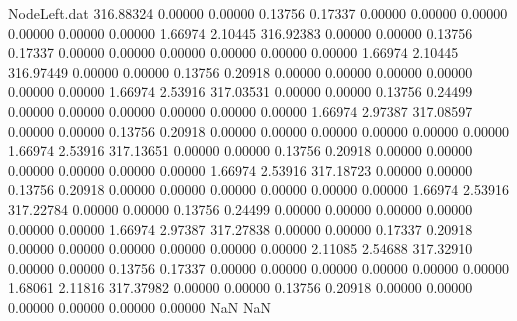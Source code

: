 \begin{filecontents}{NodeLeft.dat}
 316.88324    0.00000    0.00000     0.13756    0.17337    0.00000    0.00000    0.00000    0.00000    0.00000    0.00000    1.66974    2.10445
 316.92383    0.00000    0.00000     0.13756    0.17337    0.00000    0.00000    0.00000    0.00000    0.00000    0.00000    1.66974    2.10445
 316.97449    0.00000    0.00000     0.13756    0.20918    0.00000    0.00000    0.00000    0.00000    0.00000    0.00000    1.66974    2.53916
 317.03531    0.00000    0.00000     0.13756    0.24499    0.00000    0.00000    0.00000    0.00000    0.00000    0.00000    1.66974    2.97387
 317.08597    0.00000    0.00000     0.13756    0.20918    0.00000    0.00000    0.00000    0.00000    0.00000    0.00000    1.66974    2.53916
 317.13651    0.00000    0.00000     0.13756    0.20918    0.00000    0.00000    0.00000    0.00000    0.00000    0.00000    1.66974    2.53916
 317.18723    0.00000    0.00000     0.13756    0.20918    0.00000    0.00000    0.00000    0.00000    0.00000    0.00000    1.66974    2.53916
 317.22784    0.00000    0.00000     0.13756    0.24499    0.00000    0.00000    0.00000    0.00000    0.00000    0.00000    1.66974    2.97387
 317.27838    0.00000    0.00000     0.17337    0.20918    0.00000    0.00000    0.00000    0.00000    0.00000    0.00000    2.11085    2.54688
 317.32910    0.00000    0.00000     0.13756    0.17337    0.00000    0.00000    0.00000    0.00000    0.00000    0.00000    1.68061    2.11816
 317.37982    0.00000    0.00000     0.13756    0.20918    0.00000    0.00000    0.00000    0.00000    0.00000    0.00000        NaN        NaN
\end{filecontents}
